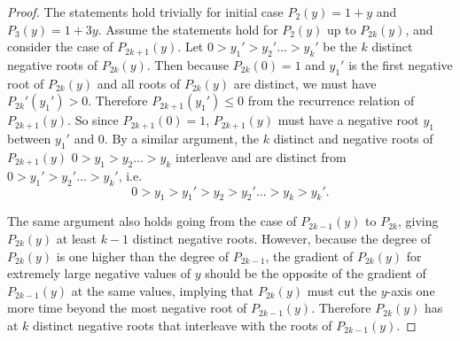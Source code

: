\documentclass{article}
\begin{document}
\begin{enumerate}[label={\bf Q\arabic*:}]
\begin{proof}
      The statements hold trivially for initial case $P_2(y)=1+y$ and
      $P_3(y)=1+3y$. Assume the statements hold for $P_2(y)$ up to
      $P_{2k}(y)$, and consider the case of $P_{2k+1}(y)$. Let $0> y_1'>
      y_2'\ldots>y_k'$ be the $k$ distinct negative roots of $P_{2k}(y)$.
      Then because $P_{2k}(0)=1$ and $y_1'$ is the first negative root of
      $P_{2k}(y)$ and all roots of $P_{2k}(y)$ are distinct, we must have
      $P_{2k}'(y_1')>0$. Therefore $P_{2k+1}(y_1')\leq0$ from the
      recurrence relation of $P_{2k+1}(y)$. So since $P_{2k+1}(0)=1$,
      $P_{2k+1}(y)$ must have a negative root $y_1$ between $y_1'$ and 0.
      By a similar argument, the $k$ distinct and negative roots of
      $P_{2k+1}(y)$ $0> y_1> y_2\ldots>y_k$ interleave and are distinct
      from $0> y_1'> y_2'\ldots>y_k'$, i.e.
      \[0>y_1>y_1'>y_2>y_2'\ldots>y_k>y_k'.\]

      The same argument also holds going from the case of $P_{2k-1}(y)$ to
      $P_{2k}$, giving $P_{2k}(y)$ at least $k-1$ distinct negative roots.
      However, because the degree of $P_{2k}(y)$ is one higher than the
      degree of $P_{2k-1}$, the gradient of $P_{2k}(y)$ for extremely large
      negative values of $y$ should be the opposite of the gradient of
      $P_{2k-1}(y)$ at the same values, implying that $P_{2k}(y)$ must cut
      the $y$-axis one more time beyond the most negative root of
      $P_{2k-1}(y)$. Therefore $P_{2k}(y)$ has at $k$ distinct negative
      roots that interleave with the roots of $P_{2k-1}(y)$.
    \end{proof}
\end{enumerate}
\end{document}
